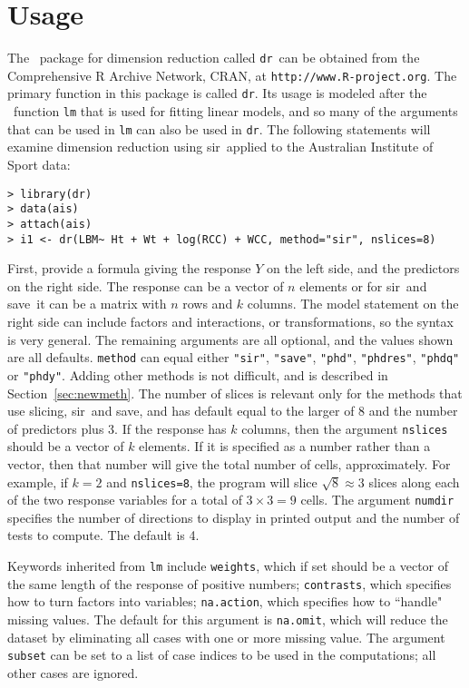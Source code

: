 \documentclass{article}
\newcommand{\dcode}[1]{{\small{\tt #1}}}
\newcommand{\ir}{{\tt dr}}
\newcommand{\dr}{{\tt dr}}
\newcommand{\sir}{{\sffamily sir}}
\newcommand{\save}{{\sffamily save}}
\begin{document}
\section{Usage}
The \R\ package for dimension reduction called \dr\ can be
obtained from the Comprehensive R Archive Network, CRAN, at
\verb+http://www.R-project.org+.
The primary function in this package is called \ir.  Its usage is
modeled after the \R\ function \dcode{lm} that is used for fitting
linear models, and so many of the arguments that can be used in
\dcode{lm} can also be used in \ir.  The following statements will
examine dimension reduction using \sir\ applied to the Australian
Institute of Sport data:
\small
\begin{verbatim}
> library(dr)
> data(ais)
> attach(ais)
> i1 <- dr(LBM~ Ht + Wt + log(RCC) + WCC, method="sir", nslices=8)
\end{verbatim}
\normalsize
\noindent First, provide a formula giving the response $Y$ on the
left side, and the predictors on the right side. The response can
be a vector of $n$ elements or for \sir\ and
\save\ it can be a matrix with $n$ rows and $k$ columns.
The model statement on the right side can include factors and
interactions, or transformations, so the syntax is very general.
The remaining arguments are all optional, and the values shown are
all defaults.  \dcode{method} can equal either \dcode{"sir"},
\dcode{"save"},  \dcode{"phd"}, \dcode{"phdres"}, \dcode{"phdq"}
or
\dcode{"phdy"}.
Adding other methods is not
difficult, and is described in Section~\ref{sec:newmeth}.
The number of slices is relevant only for the methods that use slicing,
\sir\ and \save, and has default equal to the larger of 8
and the number of predictors plus 3. If the response has $k$
columns, then the argument \dcode{nslices} should be a vector of
$k$ elements.  If it is specified as a number rather than a
vector, then that number will give the total number of cells,
approximately. For example, if $k=2$ and \dcode{nslices=8}, the
program will slice $\sqrt{8}
\approx 3$ slices along each of the two response variables for a
total of $3\times 3=9$ cells. The argument \dcode{numdir}
specifies the number of directions to display in printed output
and the number of tests to compute.  The default is 4.

Keywords inherited from \dcode{lm} include \dcode{weights},
which if set should be a
vector of the same length of the response of positive numbers;
\dcode{contrasts},
which specifies how to turn factors into variables;
\dcode{na.action}, which specifies how to ``handle" missing
values.  The default for this argument is
\dcode{na.omit}, which will reduce the dataset by eliminating all cases with
one or more missing value.  The argument \dcode{subset} can be set
to a list of case indices to be used in the computations; all
other cases are ignored.
\end{document}
